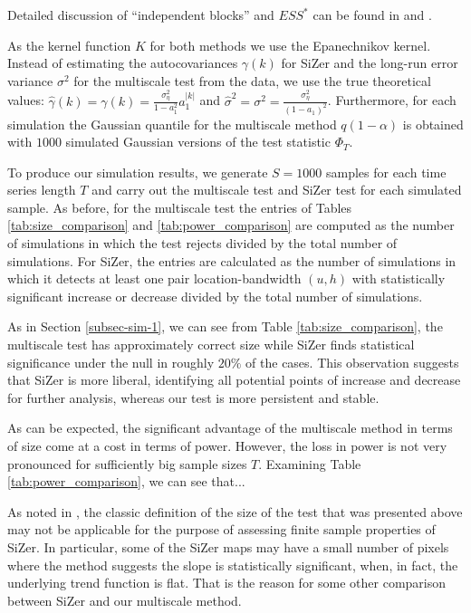 \documentclass[a4paper,12pt]{article}
\begin{document}
Detailed discussion of ``independent blocks'' and $ESS^*$ can be found in \cite{ChaudhuriMarron1999} and \cite{Rondonotti2007}. 

As the kernel function $K$ for both methods  we use the Epanechnikov kernel. Instead of estimating the autocovariances $\gamma(k)$ for SiZer and the long-run error variance $\sigma^2$ for the multiscale test from the data, we use the true theoretical values: $\widehat{\gamma}(k) = \gamma(k) = \frac{\sigma_\eta^2}{1 - a_1^2}a_1^{|k|}$ and $\widehat{\sigma}^2 = \sigma^2 = \frac{\sigma_\eta^2}{(1 - a_1)^2}$. Furthermore, for each simulation the Gaussian quantile for the multiscale method  $q(1 - \alpha)$ is obtained with $1000$ simulated Gaussian versions of the test statistic $\Phi_T$.



To produce our simulation results, we generate $S=1000$ samples for each time series length $T$ and carry out the multiscale test and SiZer test for each simulated sample. As before, for the multiscale test the entries of Tables \ref{tab:size_comparison} and \ref{tab:power_comparison} are computed as the number of simulations in which the test rejects divided by the total number of simulations. For SiZer, the entries are calculated as the number of simulations in which it detects at least one pair location-bandwidth $(u,h)$ with statistically significant increase or decrease divided by the total number of simulations.

As in Section \ref{subsec-sim-1}, we can see from Table \ref{tab:size_comparison}, the multiscale test has approximately correct size while SiZer finds statistical significance under the null in roughly $20\%$ of the cases. This observation suggests that SiZer is more liberal, identifying all potential points of increase and decrease for further analysis, whereas our test is more persistent and stable.

As can be expected, the significant advantage of the multiscale method in terms of size come at a cost in terms of power. However, the loss in power is not very pronounced for sufficiently big sample sizes $T$. Examining Table \ref{tab:power_comparison}, we can see that...

As noted in \cite{HannigMarron2006}, the classic definition of the size of the test that was presented above may not be applicable for the purpose of assessing finite sample properties of SiZer. In particular, some of the SiZer maps may have a small number of pixels where the method suggests the slope is statistically significant, when, in fact, the underlying trend function is flat. That is the reason for some other comparison between SiZer and our multiscale method.
\end{document}
